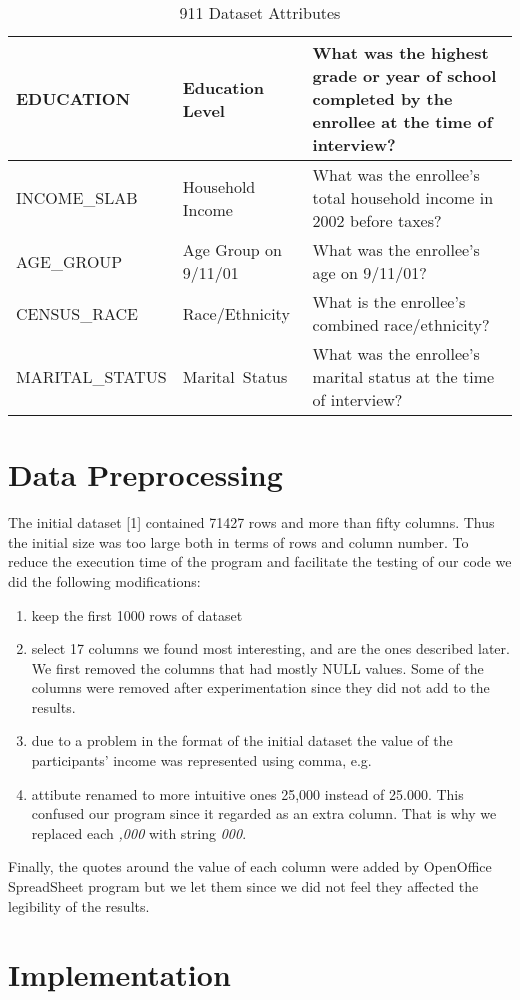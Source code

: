 \documentclass[11pt]{article}
\begin{document}
\begin{table}
\begin{tabular}{|l|l|p{5cm}|}
\hline
EDUCATION &
Education Level &
What was the highest grade or year of school completed by the enrollee at the time of interview?\\
\hline
INCOME\_SLAB &
Household Income &
What was the enrollee's total household income in 2002 before taxes?\\
\hline
AGE\_GROUP &
Age Group on 9/11/01 &
What was the enrollee's age on 9/11/01?\\
\hline
CENSUS\_RACE &
Race/Ethnicity &
What is the enrollee's combined race/ethnicity?\\
\hline
MARITAL\_STATUS &
Marital\ Status &
What was the enrollee's marital status at the time of interview?\\
\hline
\end{tabular}
\caption{911 Dataset Attributes}
\label{911t}
\end{table}

\section{Data Preprocessing}

The initial dataset [1] contained 71427 rows and more than fifty columns. Thus the initial size was too large both in terms of rows and column number. To reduce the execution time of the program and facilitate the testing of our code we did the following modifications:
\begin{enumerate}
   \item keep the first 1000 rows of dataset
   \item select 17 columns we found most interesting, and are the ones described later. We first removed the columns that had mostly NULL values. Some of the columns were removed after      experimentation since they did not add to the results.
   \item due to a problem in the format of the initial dataset the value of the participants' income was represented using comma, e.g.
   \item attibute renamed to more intuitive ones
25,000 instead of 25.000. This confused our program since it regarded as an extra column. That is why we replaced each  \textit{,000} with string  \textit{000}.
\end{enumerate}
Finally, the quotes around the value of each column were added by OpenOffice SpreadSheet program but we let them since we did not feel they affected the legibility of the results.

\section{Implementation}
\end{document}
